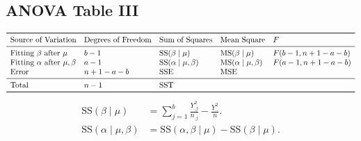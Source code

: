 \subsection*{ANOVA Table III}
\[ \begin{array}{lllll}
        \toprule
        \text{Source of Variation}                    & \text{Degrees of Freedom} & \text{Sum of Squares}           & \text{Mean Square}              & F              \\
        \midrule
        \text{Fitting }\beta\text{ after }\mu         & b-1                       & \text{SS}(\beta\mid \mu)        & \text{MS}(\beta\mid \mu)        & F(b-1,n+1-a-b) \\
        \text{Fitting }\alpha \text{ after }\mu,\beta & a-1                       & \text{SS}(\alpha\mid \mu,\beta) & \text{MS}(\alpha\mid \mu,\beta) & F(a-1,n+1-a-b) \\
        \text{Error}                                  & n+1-a-b                   & \SSE                            & \MSE                                             \\
        \midrule
        \text{Total}                                  & n-1                       & \SST                                                                               \\
        \bottomrule
    \end{array} \]
\begin{align*}
    \text{SS}(\beta\mid \mu)
     & =\sum_{j=1}^{b}\frac{Y_{.j}^2}{n_{.j}}-\frac{Y_{..}^2}{n}. \\
    \text{SS}(\alpha\mid \mu,\beta)
     & =\text{SS}(\alpha,\beta\mid \mu)-\text{SS}(\beta\mid \mu).
\end{align*}
